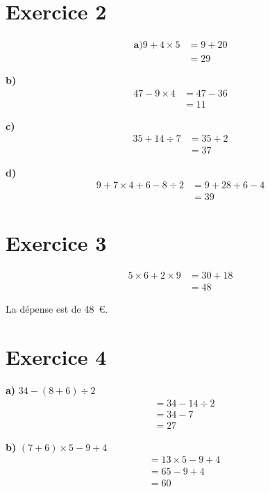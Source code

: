 \documentclass[12pt]{extarticle}
\begin{document}
\section*{Exercice 2}

\begin{align*}
\textbf{a)}
9 + 4 \times 5 &= 9 + 20 \\
               &= 29
\end{align*}

\textbf{b)}
\begin{align*}
47 - 9 \times 4 &= 47 - 36 \\
                &= 11
\end{align*}

\textbf{c)}
\begin{align*}
35 + 14 \div 7 &= 35 + 2 \\
               &= 37
\end{align*}

\textbf{d)}
\begin{align*}
9 + 7 \times 4 + 6 - 8 \div 2 &= 9 + 28 + 6 - 4 \\
                              &= 39
\end{align*}

\section*{Exercice 3}
\begin{align*}
5 \times 6 + 2 \times 9 &= 30 + 18 \\
                        &= 48
\end{align*}

La dépense est de 48~€.

\section*{Exercice 4}

\textbf{a)} $34 - (8 + 6) \div 2$
\begin{align*}
&= 34 - 14 \div 2 \\
&= 34 - 7 \\
&= 27
\end{align*}

\textbf{b)} $(7 + 6) \times 5 - 9 + 4$
\begin{align*}
&= 13 \times 5 - 9 + 4 \\
&= 65 - 9 + 4 \\
&= 60
\end{align*}
\end{document}

